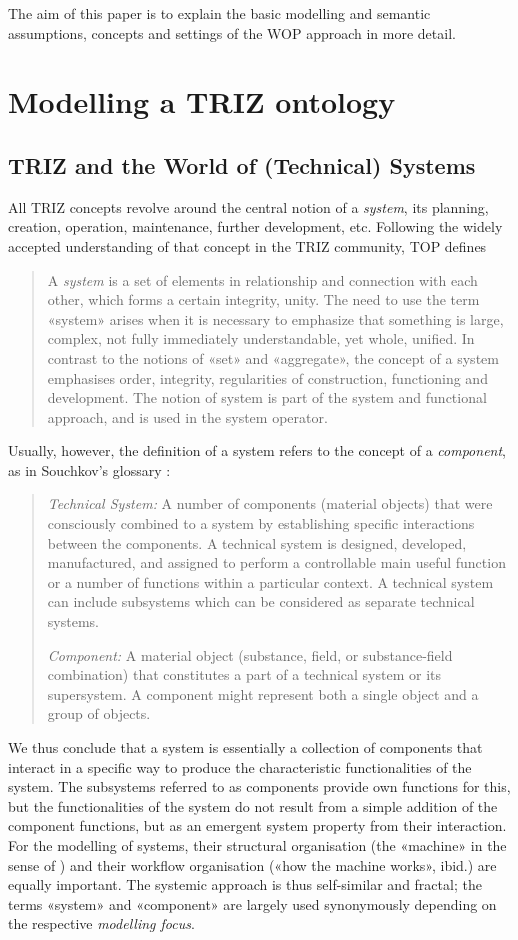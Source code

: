 \documentclass[11pt,a4paper]{article}
\begin{document}
The aim of this paper is to explain the basic modelling and semantic
assumptions, concepts and settings of the WOP approach in more detail. 

\section{Modelling a TRIZ ontology}

\subsection{TRIZ and the World of (Technical) Systems}

All TRIZ concepts revolve around the central notion of a \emph{system}, its
planning, creation, operation, maintenance, further development, etc.
Following the widely accepted understanding of that concept in the TRIZ
community, TOP defines
\begin{quote}
  A \emph{system} is a set of elements in relationship and connection with
  each other, which forms a certain integrity, unity. The need to use the term
  «system» arises when it is necessary to emphasize that something is large,
  complex, not fully immediately understandable, yet whole, unified. In
  contrast to the notions of «set» and «aggregate», the concept of a system
  emphasises order, integrity, regularities of construction, functioning and
  development. The notion of system is part of the system and functional
  approach, and is used in the system operator.
\end{quote}
Usually, however, the definition of a system refers to the concept of a
\emph{component}, as in Souchkov's glossary \cite{Souchkov2018}:
\begin{quote}
  \emph{Technical System:} A number of components (material objects) that were
  consciously combined to a system by establishing specific interactions
  between the components. A technical system is designed, developed,
  manufactured, and assigned to perform a controllable main useful function or
  a number of functions within a particular context. A technical system can
  include subsystems which can be considered as separate technical systems.

  \emph{Component:} A material object (substance, field, or substance-field
  combination) that constitutes a part of a technical system or its
  supersystem.  A component might represent both a single object and a group
  of objects.
\end{quote}
We thus conclude that a system is essentially a collection of components that
interact in a specific way to produce the characteristic functionalities of
the system.  The subsystems referred to as components provide own functions
for this, but the functionalities of the system do not result from a simple
addition of the component functions, but as an emergent system property from
their interaction. For the modelling of systems, their structural organisation
(the «machine» in the sense of \cite{TT}) and their workflow organisation
(«how the machine works», ibid.)  are equally important.  The systemic
approach is thus self-similar and fractal; the terms «system» and «component»
are largely used synonymously depending on the respective \emph{modelling
  focus}.
\end{document}
